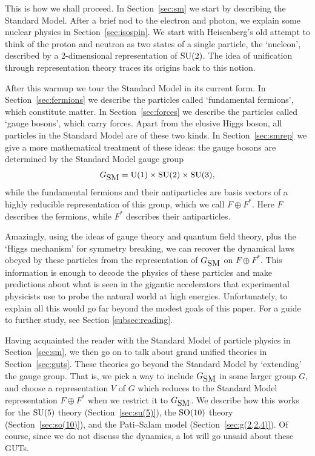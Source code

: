 \documentclass[12pt]{article}
\newcommand{\U}{{\rm U}}    %
\newcommand{\SO}{{\rm SO}}    %
\newcommand{\SU}{{\rm SU}}    %
\newcommand{\GSM}{{G_{\mbox{\rm SM}}}}  %
\begin{document}
This is how we shall proceed. In Section~\ref{sec:sm} we start by
describing the Standard Model.  After a brief nod to the electron and
photon, we explain some nuclear physics in Section~\ref{sec:isospin}.
We start with Heisenberg's old attempt to think of the proton
and neutron as two states of a single particle, the `nucleon', 
described by a 2-dimensional representation of  $\SU(2)$.  The 
idea of unification through representation theory traces its origins 
back to this notion.

After this warmup we tour the Standard Model in its current form.
In Section~\ref{sec:fermions} we describe the particles called
`fundamental fermions', which constitute matter.  In
Section~\ref{sec:forces} we describe the particles called `gauge
bosons', which carry forces.  Apart from the elusive Higgs boson, all
particles in the Standard Model are of these two kinds.   In 
Section~\ref{sec:smrep} we give a more mathematical treatment of
these ideas: the gauge bosons are determined by the Standard Model
gauge group 
\[      \GSM = \U(1) \times \SU(2) \times \SU(3) , \]
while the fundamental fermions and their antiparticles are basis
vectors of a highly reducible representation of this group,
which we call $F \oplus F^*$.  Here $F$ describes the fermions, while
$F^*$ describes their antiparticles.
  
Amazingly, using the ideas of gauge theory and quantum field theory, plus 
the `Higgs mechanism' for symmetry breaking, we can recover the dynamical
laws obeyed by these particles from the representation of $\GSM$ on $F
\oplus F^*$.  This information is enough to decode the physics of these
particles and make predictions about what is seen in the gigantic
accelerators that experimental physicists use to probe the natural
world at high energies.  Unfortunately, to explain all this would 
go far beyond the modest goals of this paper.  For a guide
to further study, see Section \ref{subsec:reading}.

Having acquainted the reader with the Standard Model of particle
physics in Section~\ref{sec:sm}, we then go on to talk about grand
unified theories in Section~\ref{sec:guts}. These theories go beyond
the Standard Model by `extending' the gauge group. That is, we pick a
way to include $\GSM$ in some larger group $G$, and choose a 
representation $V$ of $G$ which reduces to the Standard Model
representation $F \oplus F^*$ when we restrict it to $\GSM$.  We
describe how this works for the $\SU(5)$ theory
(Section~\ref{sec:su(5)}), the $\SO(10)$ theory
(Section~\ref{sec:so(10)}), and the Pati--Salam model
(Section~\ref{sec:g(2,2,4)}).
Of course, since we do not discuss the dynamics, a lot will go
unsaid about these GUTs. 
\end{document}
